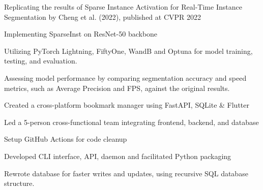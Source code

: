 \documentclass[]{resume-template}
\begin{document}
\begin{minipage}[t]{0.66\textwidth}
	\label{subsec:neatbot}
	\begin{tightemize}
		\item Replicating the results of Sparse Instance Activation for Real-Time Instance Segmentation by Cheng et al. (2022), published at CVPR 2022
		\item Implementing SparseInst on ResNet-50 backbone
		\item Utilizing PyTorch Lightning, FiftyOne, WandB and Optuna for model training, testing, and evaluation.
		\item Assessing model performance by comparing segmentation accuracy and speed metrics, such as Average Precision and FPS, against the original results.
	\end{tightemize}
	\label{subsec: Bookie}
	\begin{tightemize}
		\item Created a cross-platform bookmark manager using FastAPI, SQLite \& Flutter
		\item Led a 5-person cross-functional team integrating frontend, backend, and database
		\item Setup GitHub Actions for code cleanup
		\item Developed CLI interface, API, daemon and facilitated Python packaging
		\item Rewrote database for faster writes and updates, using recursive SQL database structure. \\
	\end{tightemize}


\end{minipage}
\end{document}
